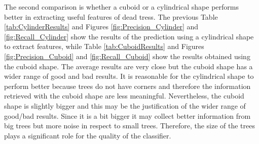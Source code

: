 \documentclass{subfiles}
\begin{document}
     \newpage
     \par The second comparison is whether a cuboid or a cylindrical shape performs better in extracting useful features of dead tress. The previous Table \ref{tab:CylinderResults} and Figures \ref{fig:Precision_Cylinder} and \ref{fig:Recall_Cylinder} show the results of the prediction using a cylindrical shape to extract features, while Table \ref{tab:CuboidResults} and Figures \ref{fig:Precision_Cuboid} and \ref{fig:Recall_Cuboid} show the results obtained using the cuboid shape. The average results are very close but the cuboid shape has a wider range of good and bad results. It is reasonable for the cylindrical shape to perform better because trees do not have corners and therefore the information retrieved with the cuboid shape are less meaningful. Nevertheless, the cuboid shape is slightly bigger and this may be the justification of the wider range of good/bad results. Since it is a bit bigger it may collect better information from big trees but more noise in respect to small trees. Therefore, the size of the trees plays a significant role for the quality of the classifier.  
      
\end{document}
